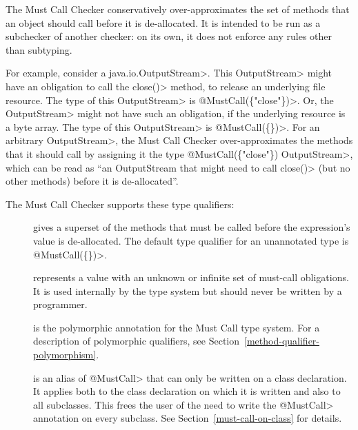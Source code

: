 \htmlhr
{}

The Must Call Checker conservatively over-approximates
the set of methods that an object should call before it is de-allocated.
It is intended to be run as a subchecker of another checker: on its own, it does not
enforce any rules other than subtyping.

For example, consider a \<java.io.OutputStream>.  This \<OutputStream>
might have an obligation to call the \<close()> method, to release an
underlying file resource. The type of this \<OutputStream> is
\<@MustCall(\{"close"\})>.  Or, the \<OutputStream> might not have such an
obligation, if the underlying resource is a byte array. The type of this
\<OutputStream> is \<@MustCall(\{\})>.  For an arbitrary \<OutputStream>,
the Must Call Checker over-approximates the methods that it should call
by assigning it the type \<@MustCall(\{"close"\}) OutputStream>, which can
be read as ``an OutputStream that might need to call \<close()> (but no
other methods) before it is de-allocated''.


The Must Call Checker supports these type qualifiers:

\begin{description}

\item[]
  gives a superset of the methods that
  must be called before the expression's value is de-allocated.
  The default type qualifier for an unannotated type is \<@MustCall(\{\})>.

\item[]
  represents a value with an unknown or infinite set of must-call obligations.
  It is used internally by the type system but should never be written by a
  programmer.

\item[]
  is the polymorphic annotation for the Must Call type system.
  For a description of polymorphic qualifiers, see
  Section~\ref{method-qualifier-polymorphism}.

\item[]
  is an alias of \<@MustCall> that can only be written on a class declaration.
  It applies both to the class declaration on which it is written and also to all subclasses.
  This frees the user of the need to write the \<@MustCall> annotation on every subclass.
  See Section~\ref{must-call-on-class} for details.

\end{description}

